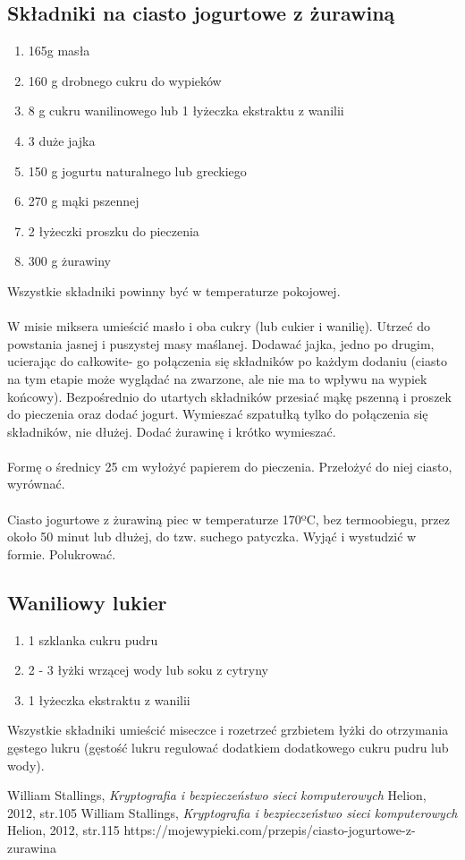\documentclass[12pt, letterpaper, titlepage]{article}
\begin{document}
\subsection*{Składniki na ciasto jogurtowe z żurawiną}
\begin{enumerate}
\item 165g masła
\item 160 g drobnego cukru do wypieków
\item 8 g cukru wanilinowego lub 1 łyżeczka ekstraktu z wanilii
\item 3 duże jajka
\item 150 g jogurtu naturalnego lub greckiego
\item 270 g mąki pszennej
\item 2 łyżeczki proszku do pieczenia
\item 300 g żurawiny
\end{enumerate}
Wszystkie składniki powinny być w temperaturze pokojowej. \\
\\
W misie miksera umieścić masło i oba cukry (lub cukier i wanilię). Utrzeć do powstania
jasnej i puszystej masy maślanej. Dodawać jajka, jedno po drugim, ucierając do całkowite-
go połączenia się składników po każdym dodaniu (ciasto na tym etapie może wyglądać na
zwarzone, ale nie ma to wpływu na wypiek końcowy). Bezpośrednio do utartych składników
przesiać mąkę pszenną i proszek do pieczenia oraz dodać jogurt. Wymieszać szpatułką tylko
do połączenia się składników, nie dłużej. Dodać żurawinę i krótko wymieszać. \\
\\
Formę o średnicy 25 cm wyłożyć papierem do pieczenia. Przełożyć do niej ciasto, wyrównać.\\
\\
Ciasto jogurtowe z żurawiną piec w temperaturze 170ºC, bez termoobiegu, przez około 50
minut lub dłużej, do tzw. suchego patyczka. Wyjąć i wystudzić w formie. Polukrować.
\subsection*{Waniliowy lukier}
\begin{enumerate}[•]
\item 1 szklanka cukru pudru
\item 2 - 3 łyżki wrzącej wody lub soku z cytryny
\item 1 łyżeczka ekstraktu z wanilii 
\end{enumerate}
Wszystkie składniki umieścić miseczce i rozetrzeć grzbietem łyżki do otrzymania gęstego
lukru (gęstość lukru regulować dodatkiem dodatkowego cukru pudru lub wody).
\begin{thebibliography}{9}
William Stallings, \textit{Kryptografia  i  bezpieczeństwo  sieci  komputerowych} Helion, 2012, str.105
William Stallings, \textit{Kryptografia  i  bezpieczeństwo  sieci  komputerowych} Helion, 2012, str.115
https://mojewypieki.com/przepis/ciasto-jogurtowe-z-zurawina
\end{thebibliography}
\end{document}
